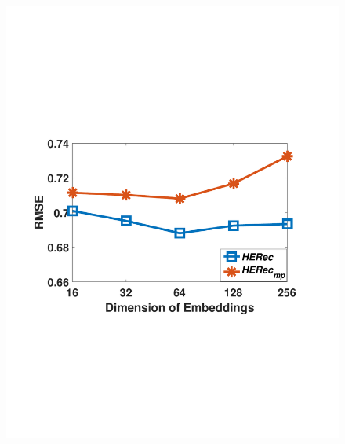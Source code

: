 \begin{figure}[t]
{\begin{minipage}[t]{0.3\textwidth}
\includegraphics[width=1\textwidth]{image/dim_db.pdf}
\end{minipage}
}
\end{figure}

